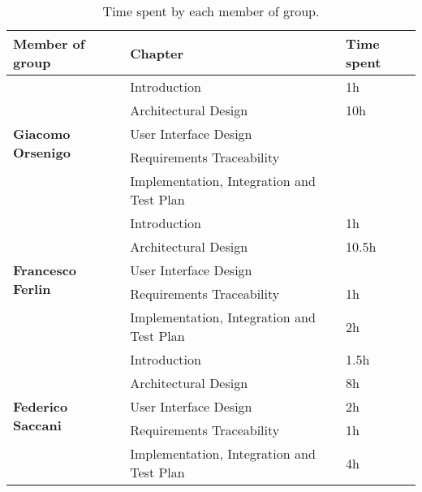 \begin{table}[H]
    \centering
    \begin{tabular}{|l|l|l|}
        \hline
        \textbf{Member of group }                  & \textbf{Chapter}                          & \textbf{Time spent} \\\hline
        \multirow{5}{*}{\textbf{Giacomo Orsenigo}} & Introduction                              & 1h                  \\
                                                   & Architectural Design                      & 10h                 \\
                                                   & User Interface Design                     &                     \\
                                                   & Requirements Traceability                 &                     \\
                                                   & Implementation, Integration and Test Plan &                     \\\hline
        \multirow{5}{*}{\textbf{Francesco Ferlin}} & Introduction                              & 1h                  \\
                                                   & Architectural Design                      & 10.5h               \\
                                                   & User Interface Design                     &                     \\
                                                   & Requirements Traceability                 & 1h                  \\
                                                   & Implementation, Integration and Test Plan & 2h                  \\\hline
        \multirow{5}{*}{\textbf{Federico Saccani}} & Introduction                              & 1.5h                \\
                                                   & Architectural Design                      & 8h                  \\
                                                   & User Interface Design                     & 2h                    \\
                                                   & Requirements Traceability                 & 1h                    \\
                                                   & Implementation, Integration and Test Plan & 4h                  \\\hline
    \end{tabular}
    \caption{Time spent by each member of group.}
    \label{table:Time spent}
\end{table}
